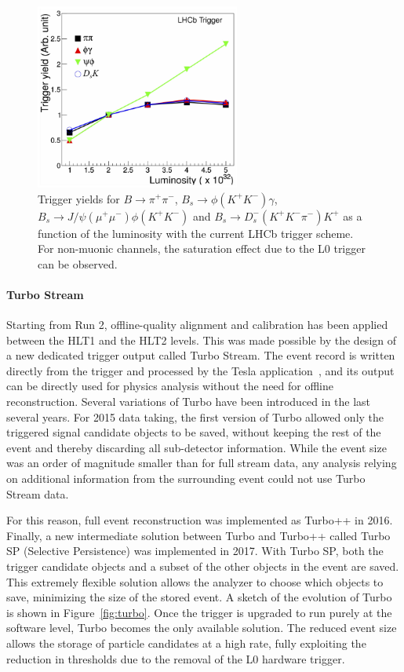 \begin{figure}[t]
\centerline{\includegraphics[width=0.6\textwidth]{figures/L0vsLumi.pdf}}
\caption{Trigger yields for ${B\to\pi^+\pi^-}$, ${B_s\to\phi(K^+K^-)\gamma}$, ${B_s\to J/\psi(\mu^+\mu^-)\phi(K^+K^-)}$ and ${B_s\to D_s^-(K^+K^-\pi^-)K^+}$ as a function of the luminosity with the current LHCb trigger scheme. For non-muonic channels, the saturation effect due to the L0 trigger can be observed.}
  \label{fig:triggervsLumi}
\end{figure}

\paragraph{Turbo Stream}

Starting from Run 2, offline-quality alignment and calibration has been applied between the HLT1 and the HLT2 levels. This was made possible by the design of a new dedicated trigger output called Turbo Stream. The event record is written directly from the trigger and processed by the Tesla application~\cite{Aaij:2016rxn}, and its output can be directly used for physics analysis without the need for offline reconstruction. Several variations of Turbo have been introduced in the last several
years. For 2015 data taking, the first version of Turbo allowed only the triggered signal candidate objects to be saved, without keeping the rest of the event and thereby discarding all sub-detector information. While the event size was an order of magnitude smaller than for full stream data, any analysis relying on additional information from the surrounding event could not use Turbo Stream data.

For this reason, full event reconstruction was implemented as Turbo++ in 2016. Finally, a new intermediate solution between Turbo and Turbo++ called Turbo SP (Selective Persistence) was implemented in 2017. With Turbo SP, both the trigger candidate objects and a subset of the other objects in the event are saved. This extremely flexible solution allows the analyzer to choose which objects to save, minimizing the size of the stored event. A sketch of the evolution of Turbo is shown in Figure~\ref{fig:turbo}. Once the trigger is upgraded to run purely at the software level, Turbo becomes the only available solution. The reduced event size allows the storage of particle candidates at a high rate, fully exploiting the reduction in \pt thresholds due to the removal of the L0 hardware trigger.


